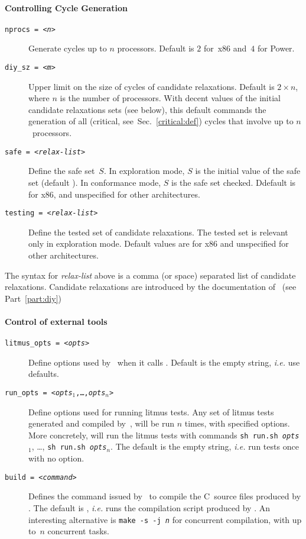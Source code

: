 \paragraph{Controlling Cycle Generation}
\begin{description}
\item[{\tt nprocs = <\textit{n}>}]
Generate cycles up to $n$ processors. Default is $2$ for~x86 and~$4$ for Power.
\item[{\tt diy\_sz = <\textit{m}>}]
Upper limit on the size of cycles of candidate relaxations.
Default is $2 \times n$, where $n$ is the number of processors.
With decent values of the initial candidate relaxations sets
(see below), this default commands the generation of all
(critical, see~Sec.~\ref{critical:def}) cycles that involve
up to $n$~processors.
\item[{\tt safe = <\textit{relax-list}>}]
Define the safe set~$S$. In exploration mode, $S$ is the initial value
of the safe set (default ). In conformance
mode, $S$ is the safe set checked.
Ddefault is  for x86,
and unspecified for other architectures.
\item[{\tt testing = <\textit{relax-list}>}]
Define the tested set of candidate relaxations.
The tested set is relevant only in exploration mode.
Default values are
 for x86
and unspecified for other architectures.
\end{description}
The syntax for \textit{relax-list} above is a comma (or space) separated
list of candidate relaxations.
Candidate relaxations are introduced by the documentation of~\diy{}
(see Part~\ref{part:diy})

\paragraph{Control of external tools}
\begin{description}
\item[{\tt litmus\_opts = <\textit{opts}>}]
Define options used by~\dont{} when it calls \litmus.
Default is the empty string, \emph{i.e.} use \litmus{} defaults.
\item[{\tt run\_opts = <\textit{opts$_1$},\ldots,\textit{opts$_n$}>}]
Define options used for running litmus tests.
Any set of litmus tests generated and compiled by~\dont,
will be run $n$ times, with specified options.
More concretely, \dont{} will run the litmus tests with commands
\texttt{sh run.sh \textit{opts$_1$}}, \ldots,
\texttt{sh run.sh \textit{opts$_n$}}.
The default is the empty string, \emph{i.e.} run tests once with no option.
\item[{\tt build = <\textit{command}>}]
Defines the command issued by~\dont{} to compile the C~source files
produced by \litmus.
The default is , \emph{i.e.} runs the compilation script
produced by \litmus. An interesting alternative is
\texttt{make -s -j \textit{n}} for concurrent compilation,
with up to~$n$ concurrent tasks.
\end{description}

